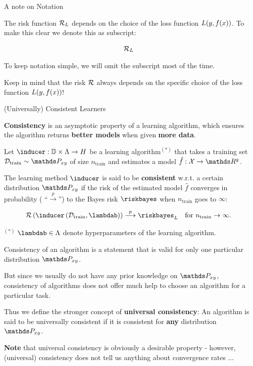 \begin{vbframe}{A note on Notation} 

The risk function $\mathcal{R}_L$ depends on the choice of the loss function $L(y, f(x))$. To make this clear we denote this as subscript: 

$$
	\mathcal{R}_L
$$

To keep notation simple, we will omit the subscript most of the time. 

\lz 

Keep in mind that the risk $\mathcal{R}$ always depends on the specific choice of the loss function $L(y, f(x))$!

\end{vbframe}


\begin{vbframe}{(Universally) Consistent Learners}

\textbf{Consistency} is an asymptotic property of a learning algorithm, which ensures the algorithm returns \textbf{better models} when given \textbf{more data}.

\lz 

Let $\inducer:\mathbb{D}\times \Lambda \to \Hspace$ be a learning algorithm$^{(*)}$ that takes a training set $\Dtrain \sim \Pxy$ of size $n_\text{train}$ and estimates a model $\hat f: \Xspace \to \R^g$. 

\lz 

The learning method $\inducer$ is said to be \textbf{consistent} w.r.t. a certain distribution $\Pxy$ if the risk of the estimated model $\hat f$ converges in probability ( \enquote{$\overset{p}{\longrightarrow}$}) to the Bayes risk $\riskbayes$ when $n_\text{train}$ goes to $\infty$: 

$$
	\risk\left(\inducer\left(\Dtrain, \lambdab\right)\right) \overset{p}{\longrightarrow} \riskbayes_L \quad \text{for } n_\text{train} \to \infty.
$$

\vfill


\begin{footnotesize}$^{(*)}$ $\lambdab \in \Lambda$ denote hyperparameters of the learning algorithm.\end{footnotesize} 

\framebreak 

Consistency of an algorithm is a statement that is valid for only one particular distribution $\Pxy$.

\lz 

But since we usually do not have any prior knowledge on $\Pxy$, consistency of algorithms does not offer much help to choose an algorithm for a particular task. 

\lz 

Thus we define the stronger concept of \textbf{universal consistency}: An algorithm is said to be universally consistent if it is consistent for \textbf{any} distribution $\Pxy$. 

\lz 

\textbf{Note} that universal consistency is obviously a desirable property - however, (universal) consistency does not tell us anything about convergence rates ...

\end{vbframe}

